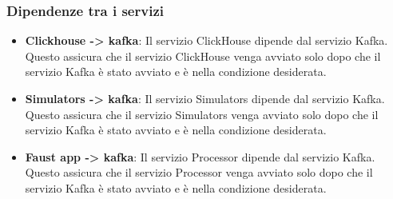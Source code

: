     \subsubsection{Dipendenze tra i servizi}
\begin{itemize}
    \item \textbf{Clickhouse -> kafka}: Il servizio ClickHouse dipende dal servizio Kafka. Questo assicura che il servizio ClickHouse venga avviato solo dopo che il servizio Kafka è stato avviato e è nella condizione desiderata.

    \item \textbf{Simulators -> kafka}: Il servizio Simulators dipende dal servizio Kafka. Questo assicura che il servizio Simulators venga avviato solo dopo che il servizio Kafka è stato avviato e è nella condizione desiderata.
    
    \item \textbf{ Faust app -> kafka}: Il servizio Processor dipende dal servizio Kafka. Questo assicura che il servizio Processor venga avviato solo dopo che il servizio Kafka è stato avviato e è nella condizione desiderata.
\end{itemize}

